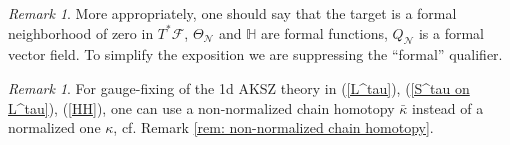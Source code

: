 \documentclass{amsart}
\theoremstyle{plain} %
\theoremstyle{definition}
\theoremstyle{remark}
\newtheorem{rem}[thm]{Remark}
\newcommand{\ra}{\rightarrow}
\newcommand{\til}{\widetilde}
\newcommand{\F}{\mathcal{F}}
\newcommand{\N}{\mathcal{N}}
\begin{document}
\begin{rem} %
    More appropriately, one should say that the target is a formal neighborhood of zero in $T^*\F$, $\Theta_\N$ and $\mathbb{H}$ are formal functions, $Q_\N$ is a formal vector field. To simplify the exposition we are suppressing the ``formal'' qualifier.
\end{rem}

\begin{rem}
    For gauge-fixing of the 1d AKSZ theory in (\ref{L^tau}), (\ref{S^tau on L^tau}), (\ref{HH}), one can
    use a non-normalized chain homotopy $\bar\kappa$ instead of a normalized one $\kappa$, cf. Remark \ref{rem: non-normalized chain homotopy}.
\end{rem}

\end{document}
